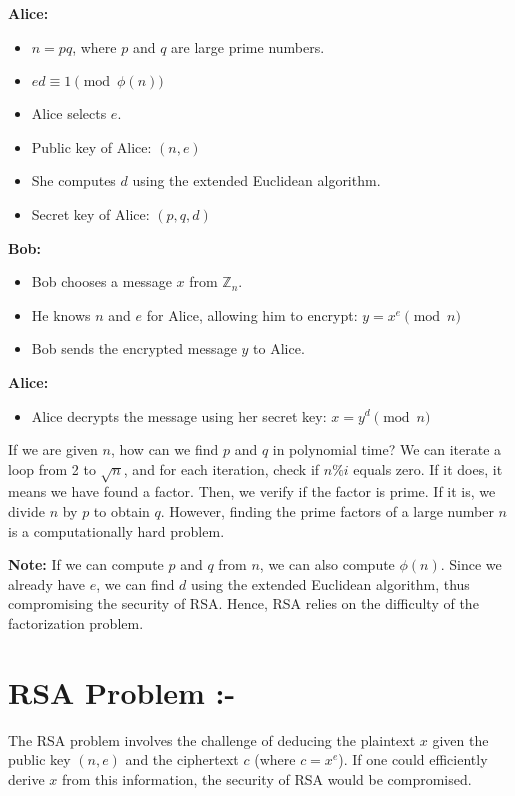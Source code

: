 \documentclass[11pt]{article}
\begin{document}
\textbf{Alice:}
\begin{itemize}
    \item $n = pq$, where $p$ and $q$ are large prime numbers.
    \item $ed \equiv 1 \pmod{\phi(n)}$
    \item Alice selects $e$.
    \item Public key of Alice: $(n, e)$
    \item She computes $d$ using the extended Euclidean algorithm.
    \item Secret key of Alice: $(p, q, d)$
\end{itemize}

\textbf{Bob:}
\begin{itemize}
    \item Bob chooses a message $x$ from $\mathbb{Z}_n$.
    \item He knows $n$ and $e$ for Alice, allowing him to encrypt: $y = x^e \pmod{n}$
    \item Bob sends the encrypted message $y$ to Alice.
\end{itemize}

\textbf{Alice:}
\begin{itemize}
    \item Alice decrypts the message using her secret key: $x = y^d \pmod{n}$
\end{itemize}

If we are given $n$, how can we find $p$ and $q$ in polynomial time? We can iterate a loop from 2 to $\sqrt{n}$, and for each iteration, check if $n \% i$ equals zero. If it does, it means we have found a factor. Then, we verify if the factor is prime. If it is, we divide $n$ by $p$ to obtain $q$. However, finding the prime factors of a large number $n$ is a computationally hard problem.

\textbf{Note:} If we can compute $p$ and $q$ from $n$, we can also compute $\phi(n)$. Since we already have $e$, we can find $d$ using the extended Euclidean algorithm, thus compromising the security of RSA. Hence, RSA relies on the difficulty of the factorization problem.

\section{RSA Problem :-}
The RSA problem involves the challenge of deducing the plaintext $x$ given the public key $(n, e)$ and the ciphertext $c$ (where $c = x^e$). If one could efficiently derive $x$ from this information, the security of RSA would be compromised.\\
\end{document}
